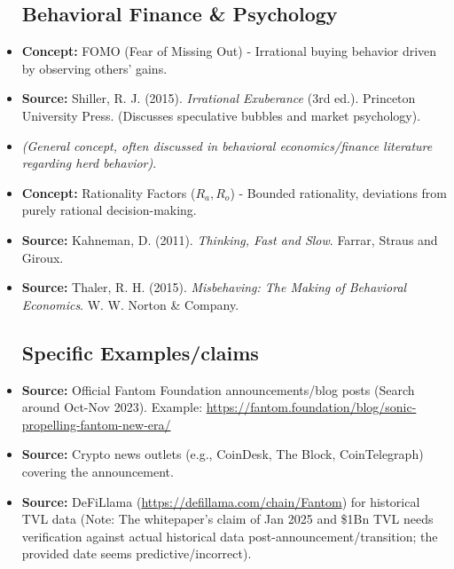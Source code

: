 \documentclass{article}
\begin{document}
\begin{itemize}
    
    \subsection{Behavioral Finance & Psychology}
    \item \textbf{Concept:} FOMO (Fear of Missing Out) - Irrational buying behavior driven by observing others' gains.
    \item \textbf{Source:} Shiller, R. J. (2015). \textit{Irrational Exuberance} (3rd ed.). Princeton University Press. (Discusses speculative bubbles and market psychology).
    \item \textit{(General concept, often discussed in behavioral economics/finance literature regarding herd behavior)}.
    \item \textbf{Concept:} Rationality Factors ($R_a, R_o$) - Bounded rationality, deviations from purely rational decision-making.
    \item \textbf{Source:} Kahneman, D. (2011). \textit{Thinking, Fast and Slow}. Farrar, Straus and Giroux.
    \item \textbf{Source:} Thaler, R. H. (2015). \textit{Misbehaving: The Making of Behavioral Economics}. W. W. Norton & Company.
    
    \subsection{Specific Examples/claims}
    \item \textbf{Source:} Official Fantom Foundation announcements/blog posts (Search around Oct-Nov 2023). Example: \url{https://fantom.foundation/blog/sonic-propelling-fantom-new-era/}
    \item \textbf{Source:} Crypto news outlets (e.g., CoinDesk, The Block, CoinTelegraph) covering the announcement.
    \item \textbf{Source:} DeFiLlama (\url{https://defillama.com/chain/Fantom}) for historical TVL data (Note: The whitepaper's claim of Jan 2025 and \$1Bn TVL needs verification against actual historical data post-announcement/transition; the provided date seems predictive/incorrect).
    
    

\end{itemize}
\end{document}
